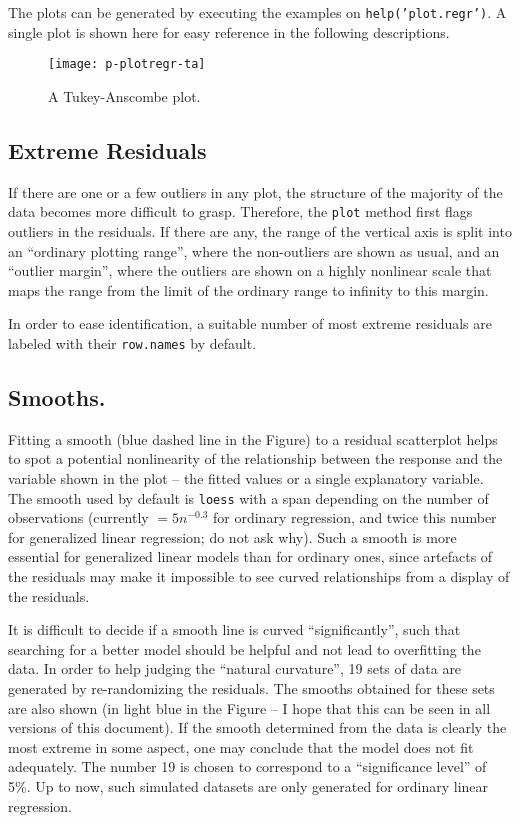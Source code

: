 \documentclass[11pt]{article}
\providecommand{\T}{\texttt}
\begin{document}
The plots can be generated by executing the examples on
\T{help('plot.regr')}. 
A single plot is shown here for easy reference in the following
descriptions. 

\begin{figure}[htb]
\centerline{\texttt{[image: p-plotregr-ta]}}
\caption{A Tukey-Anscombe plot.}
\end{figure}

\subsection{Extreme Residuals}
If there are one or a few outliers in any plot, the structure of the
majority of the data becomes more difficult to grasp. 
Therefore, the \T{plot} method first flags outliers in the residuals.
If there are any, the range of the vertical axis is split into an
``ordinary plotting range'', where the non-outliers are shown as usual, and
an ``outlier margin'', where the outliers are shown on a highly nonlinear
scale that maps the range from the limit of the ordinary range to infinity 
to this margin.

In order to ease identification, a suitable number of most extreme
residuals are labeled with their \T{row.names} by default.

\subsection{Smooths.}
Fitting a smooth (blue dashed line in the Figure) 
to a residual scatterplot helps to spot a potential
nonlinearity of the relationship between the response and the variable
shown in the plot -- the fitted values or a single explanatory variable.
The smooth used by default is \T{loess} with a span depending on the number
of observations (currently $= 5n^{-0.3}$ for ordinary regression, and twice 
this number for generalized linear regression; do not ask why).
Such a smooth is more essential for generalized linear models than for 
ordinary ones, since artefacts of the residuals may make it impossible to 
see curved relationships from a display of the residuals.

It is difficult to decide if a smooth line is curved ``significantly'',
such that searching for a better model should be helpful and not lead to 
overfitting the data.
In order to help judging the ``natural curvature'', 19 sets of data are
generated by 
re-randomizing the residuals. 
The smooths obtained for these sets are also shown (in light blue in the
Figure -- I hope that this can be seen in all versions of this document).
If the smooth determined from the data is clearly the most extreme in some
aspect, one may conclude that the model does not fit adequately.
The number 19 is chosen to correspond to a ``significance level'' of 5\%.
Up to now, such simulated datasets are only generated for ordinary linear
regression. 
\end{document}

